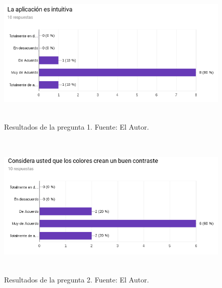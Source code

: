 \begin{figure}[H]
\begin{center}
	\includegraphics[width=\textwidth,height=7cm]{img/encuestas/aplicacion_intuitiva.png}
\end{center}
\caption{Resultados de la pregunta 1. Fuente: El Autor.}
\label{fig:respuesta_aplicacion_intuitiva}
\end{figure}


\begin{figure}[H]
\begin{center}
	\includegraphics[width=\textwidth,height=7cm]{img/encuestas/contraste_colores.png}
\end{center}
\caption{Resultados de la pregunta 2. Fuente: El Autor.}
\label{fig:respuesta_contraste_colores}
\end{figure}

\newpage

